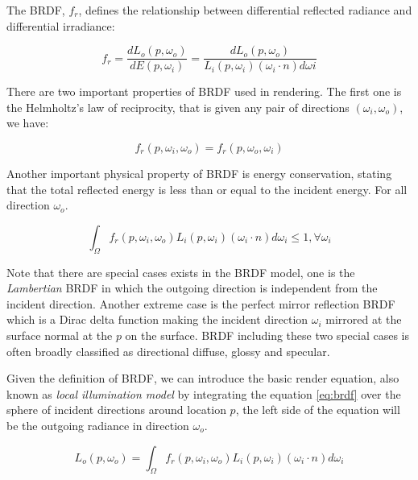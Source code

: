 The BRDF, \(f_{r}\), defines the relationship between differential reflected radiance and differential irradiance: 

\begin{equation}
f_{r} = \frac{dL_{o}(p, \omega_{o})}{dE(p, \omega_{i})} = \frac{dL_{o}(p, \omega_{o})}{L_{i}(p, \omega_{i})(\omega_{i} \cdot n)d\omega{i}}
\label{eq:brdf} 
\end{equation} 

There are two important properties of BRDF used in rendering. The first one is the Helmholtz's law of reciprocity, that is given any pair of directions \( (\omega_{i}, \omega_{o} ) \), we have: 

\begin{equation}
f_{r}(p, \omega_{i}, \omega_{o}) = f_r(p, \omega_{o}, \omega_{i})
\end{equation}

Another important physical property of BRDF is energy conservation, stating that the total reflected energy is less than or equal to the incident energy. For all direction \( \omega_{o} \).

\begin{equation}
 \int_{\Omega}f_{r}(p, \omega_{i}, \omega_{o})L_{i}(p, \omega_{i})(\omega_{i} \cdot n)d\omega_{i} \leq 1 , \forall \omega_{i}
\end{equation}

Note that there are special cases exists in the BRDF model, one is the \emph{Lambertian} BRDF in which the outgoing direction  is independent from the incident direction. Another extreme case is the perfect mirror reflection BRDF which is a Dirac delta function making the incident direction \(\omega_{i}\) mirrored at the surface normal at the \(p\) on the surface. BRDF including these two special cases is often broadly classified as directional diffuse, glossy and specular. 

Given the definition of BRDF, we can introduce the basic render equation, also known as \emph{local illumination model} by integrating the equation \ref{eq:brdf} over the sphere of incident directions around location \(p\), the left side of the equation will be the outgoing radiance in direction \(\omega_{o}\). 

\begin{equation}
L_{o}(p, \omega_{o}) = \int_{\Omega}f_{r}(p, \omega_{i}, \omega_{o})L_{i}(p, \omega_{i})(\omega_{i} \cdot n)d\omega_{i}
\label{eq:local_render_equation}
\end{equation}

